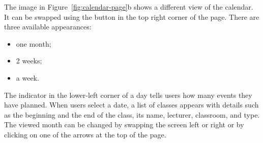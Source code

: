 The image in Figure~\ref{fig:calendar-page}b shows a different view of the calendar. It can be swapped using the button in the top right corner of the page. There are three available appearances:
\begin{itemize}
    \item one month;
    \item 2 weeks;
    \item a week.
\end{itemize}
 
The indicator in the lower-left corner of a day tells users how many events they have planned. When users select a date, a list of classes appears with details such as the beginning and the end of the class, its name, lecturer, classroom, and type.
The viewed month can be changed by swapping the screen left or right or by clicking on one of the arrows at the top of the page.


